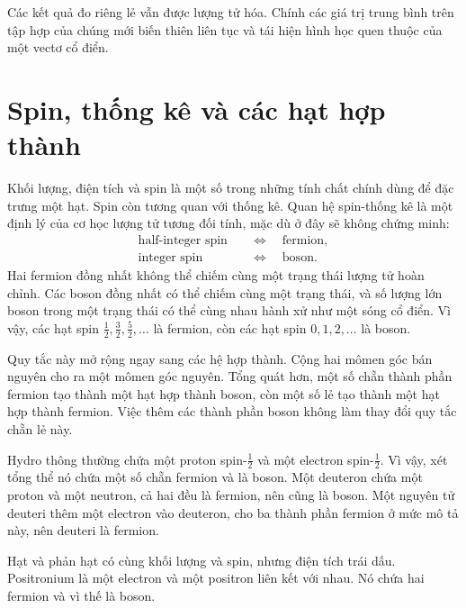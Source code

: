 Các kết quả đo riêng lẻ vẫn được lượng tử hóa. Chính các giá trị trung bình trên tập hợp của chúng mới biến thiên liên tục và tái hiện hình học quen thuộc của một vectơ cổ điển.

\section{Spin, thống kê và các hạt hợp thành}

Khối lượng, điện tích và spin là một số trong những tính chất chính dùng để đặc trưng một hạt. Spin còn tương quan với thống kê. Quan hệ spin-thống kê là một định lý của cơ học lượng tử tương đối tính, mặc dù ở đây sẽ không chứng minh:
\begin{equation}
\begin{aligned}
\text{half-integer spin} &\quad\Longleftrightarrow\quad \text{fermion},\\
\text{integer spin} &\quad\Longleftrightarrow\quad \text{boson}.
\end{aligned}
\end{equation}
Hai fermion đồng nhất không thể chiếm cùng một trạng thái lượng tử hoàn chỉnh. Các boson đồng nhất có thể chiếm cùng một trạng thái, và số lượng lớn boson trong một trạng thái có thể cùng nhau hành xử như một sóng cổ điển. Vì vậy, các hạt spin \(\tfrac12,\tfrac32,\tfrac52,\ldots\) là fermion, còn các hạt spin \(0,1,2,\ldots\) là boson.

Quy tắc này mở rộng ngay sang các hệ hợp thành. Cộng hai mômen góc bán nguyên cho ra một mômen góc nguyên. Tổng quát hơn, một số chẵn thành phần fermion tạo thành một hạt hợp thành boson, còn một số lẻ tạo thành một hạt hợp thành fermion. Việc thêm các thành phần boson không làm thay đổi quy tắc chẵn lẻ này.

Hydro thông thường chứa một proton spin-\(\tfrac12\) và một electron spin-\(\tfrac12\). Vì vậy, xét tổng thể nó chứa một số chẵn fermion và là boson. Một deuteron chứa một proton và một neutron, cả hai đều là fermion, nên cũng là boson. Một nguyên tử deuteri thêm một electron vào deuteron, cho ba thành phần fermion ở mức mô tả này, nên deuteri là fermion.

Hạt và phản hạt có cùng khối lượng và spin, nhưng điện tích trái dấu. Positronium là một electron và một positron liên kết với nhau. Nó chứa hai fermion và vì thế là boson.

